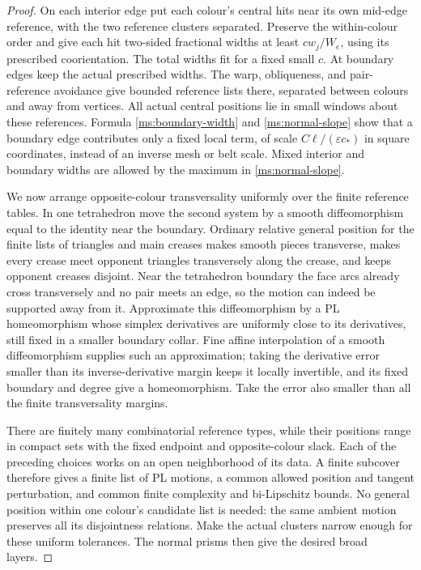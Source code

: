 \documentclass[11pt]{article}
\numberwithin{equation}{section}
\theoremstyle{definition}
\theoremstyle{remark}
\begin{document}
\begin{proof}
On each interior edge put each colour's central hits near its own
mid-edge reference, with the two reference clusters separated.
Preserve the within-colour order and give each hit two-sided
fractional widths at least $c w_j/W_e$, using its prescribed
coorientation.  The total widths fit for a fixed small $c$.
At boundary edges keep the actual prescribed widths.  The warp,
obliqueness, and pair-reference avoidance give bounded reference
lists there, separated between colours and away from vertices.
All actual central positions lie in small windows about these
references.  Formula \eqref{ms:boundary-width} and
\eqref{ms:normal-slope} show that a boundary edge contributes only a
fixed local term, of scale $C\ell/(\varepsilon c_*)$ in square
coordinates, instead of an inverse mesh or belt scale.  Mixed
interior and boundary widths are allowed by the maximum in
\eqref{ms:normal-slope}.

We now arrange opposite-colour transversality uniformly over the
finite reference tables.  In one tetrahedron move the second
system by a smooth diffeomorphism equal to the identity near the
boundary.  Ordinary relative general position for the finite lists
of triangles and main creases makes smooth pieces transverse,
makes every crease meet opponent triangles transversely along the
crease, and keeps opponent creases disjoint.  Near the tetrahedron
boundary the face arcs already cross transversely and no pair meets
an edge, so the motion can indeed be supported away from it.
Approximate this diffeomorphism by a PL homeomorphism whose
simplex derivatives are uniformly close to its derivatives, still
fixed in a smaller boundary collar.  Fine affine interpolation of
a smooth diffeomorphism supplies such an approximation; taking the
derivative error smaller than its inverse-derivative margin keeps
it locally invertible, and its fixed boundary and degree give a
homeomorphism.  Take the error also smaller than all the finite
transversality margins.

There are finitely many combinatorial reference types, while their
positions range in compact sets with the fixed endpoint and
opposite-colour slack.  Each of the preceding choices works on an
open neighborhood of its data.  A finite subcover therefore gives
a finite list of PL motions, a common allowed position and tangent
perturbation, and common finite complexity and bi-Lipschitz bounds.
No general position within one colour's candidate list is needed:
the same ambient motion preserves all its disjointness relations.
Make the actual clusters narrow enough for these uniform
tolerances.  The normal prisms then give the desired broad layers.


\end{proof}
\end{document}
